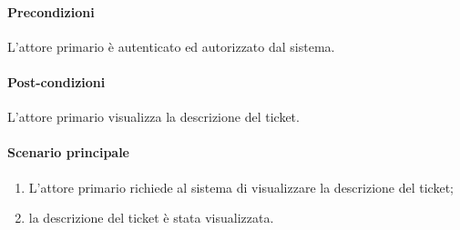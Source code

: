 \paragraph{Precondizioni}  L'attore primario è autenticato ed autorizzato dal sistema.
\paragraph{Post-condizioni} L'attore primario visualizza la descrizione del ticket.
\paragraph{Scenario principale}
\begin{enumerate}
    \item L'attore primario richiede al sistema di visualizzare la descrizione del ticket;
    \item la descrizione del ticket è stata visualizzata.
\end{enumerate}